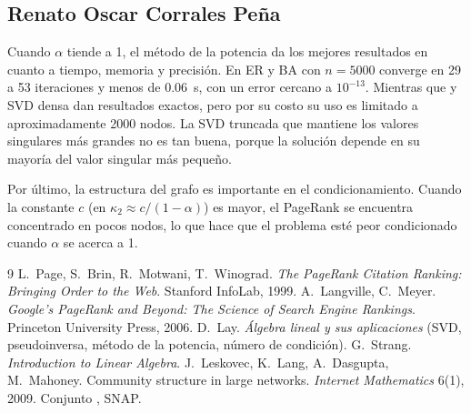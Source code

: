\documentclass[11pt,a4paper]{article}
\newcommand{\code}[1]{\texttt{\detokenize{#1}}}
\begin{document}
\subsection{Renato Oscar Corrales Pe\~na}
Cuando $\alpha$ tiende a 1, el m\'etodo de la potencia da los mejores resultados en cuanto a tiempo, memoria y precisi\'on. En ER y BA con $n = 5000$ converge en 29 a 53 iteraciones y menos de 0.06~s, con un error cercano a $10^{-13}$. Mientras que \code{pinv} y SVD densa dan resultados exactos, pero por su costo su uso es limitado a aproximadamente 2000 nodos. La SVD truncada que mantiene los valores singulares m\'as grandes no es tan buena, porque la soluci\'on depende en su mayor\'ia del valor singular m\'as peque\~no.

Por \'ultimo, la estructura del grafo es importante en el condicionamiento. Cuando la constante $c$ (en $\kappa_2 \approx c/(1-\alpha)$) es mayor, el PageRank se encuentra concentrado en pocos nodos, lo que hace que el problema est\'e peor condicionado cuando $\alpha$ se acerca a 1.
\FloatBarrier

\begin{thebibliography}{9}\small
{} L.~Page, S.~Brin, R.~Motwani, T.~Winograd. \emph{The PageRank Citation Ranking: Bringing Order to the Web}. Stanford InfoLab, 1999.
 A.~Langville, C.~Meyer. \emph{Google's PageRank and Beyond: The Science of Search Engine Rankings}. Princeton University Press, 2006.
 D.~Lay. \emph{\'Algebra lineal y sus aplicaciones} (SVD, pseudoinversa, m\'etodo de la potencia, n\'umero de condici\'on).
 G.~Strang. \emph{Introduction to Linear Algebra}.
 J.~Leskovec, K.~Lang, A.~Dasgupta, M.~Mahoney. Community structure in large networks. \emph{Internet Mathematics} 6(1), 2009. Conjunto \code{web-Stanford}, SNAP.
\end{thebibliography}
\end{document}
